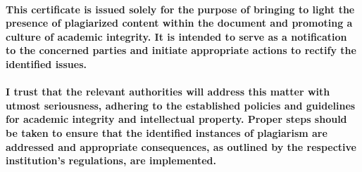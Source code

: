 \documentclass{report}[12pt]
\begin{document}
\paragraph{This certificate is issued solely for the purpose of bringing to light the presence of plagiarized content within the document and promoting a culture of academic integrity. It is intended to serve as a notification to the concerned parties and initiate appropriate actions to rectify the identified issues.}

\paragraph{I trust that the relevant authorities will address this matter with utmost seriousness, adhering to the established policies and guidelines for academic integrity and intellectual property. Proper steps should be taken to ensure that the identified instances of plagiarism are addressed and appropriate consequences, as outlined by the respective institution's regulations, are implemented.}





% 




























\nocite{diel2016communication, mohammad2017devops, rodriguez2012distributed, zolkifli2018version}
\end{document}
